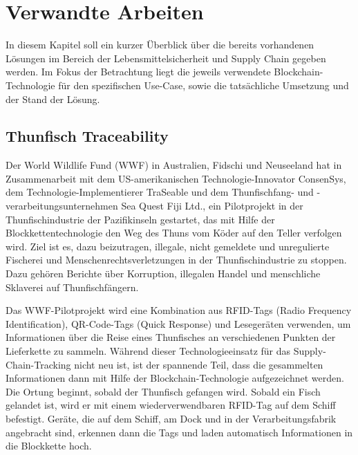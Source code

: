 \section{Verwandte Arbeiten} \label{sec:related-work}
In diesem Kapitel soll ein kurzer Überblick über die bereits vorhandenen Lösungen im Bereich der Lebensmittelsicherheit und Supply Chain gegeben werden. Im Fokus der Betrachtung liegt die jeweils verwendete Blockchain-Technologie für den spezifischen Use-Case, sowie die tatsächliche Umsetzung und der Stand der Lösung.

\subsection{Thunfisch Traceability}
Der World Wildlife Fund (WWF) in Australien, Fidschi und Neuseeland hat in Zusammenarbeit mit dem US-amerikanischen Technologie-Innovator ConsenSys, dem Technologie-Implementierer TraSeable und dem Thunfischfang- und -verarbeitungs\-unternehmen Sea Quest Fiji Ltd., ein Pilotprojekt in der Thunfischindustrie der Pazifikinseln gestartet, das mit Hilfe der Blockkettentechnologie den Weg des Thuns vom \glqq Köder auf den Teller\grqq{} verfolgen wird. Ziel ist es, dazu beizutragen, illegale, nicht gemeldete und unregulierte Fischerei und Menschenrechtsverletzungen in der Thunfischindustrie zu stoppen. Dazu gehören Berichte über Korruption, illegalen Handel und menschliche Sklaverei auf Thunfischfängern.

Das WWF-Pilotprojekt wird eine Kombination aus RFID-Tags (Radio Frequency Identification), QR-Code-Tags (Quick Response) und Lesegeräten verwenden, um Informationen über die Reise eines Thunfisches an verschiedenen Punkten der Lieferkette zu sammeln. Während dieser Technologieeinsatz für das Supply-Chain-Tracking nicht neu ist, ist der spannende Teil, dass die gesammelten Informationen dann mit Hilfe der Blockchain-Technologie aufgezeichnet werden. Die Ortung beginnt, sobald der Thunfisch gefangen wird. Sobald ein Fisch gelandet ist, wird er mit einem wiederverwendbaren RFID-Tag auf dem Schiff befestigt. Geräte, die auf dem Schiff, am Dock und in der Verarbeitungsfabrik angebracht sind, erkennen dann die Tags und laden automatisch Informationen in die Blockkette hoch. 

